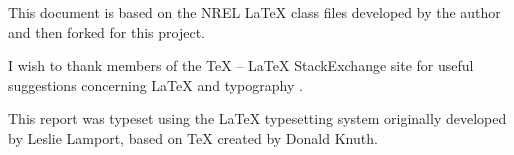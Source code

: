 This document is based on the NREL LaTeX class files developed by the author and then forked for this project.

I wish to thank members of the TeX -- LaTeX StackExchange site for useful suggestions concerning LaTeX and typography \citep{texstackexchange}.

This report was typeset using the LaTeX typesetting system originally developed by Leslie Lamport, based on TeX created by Donald Knuth.